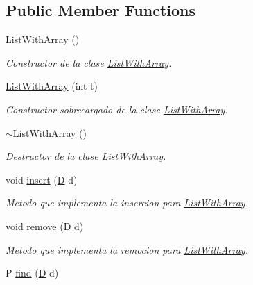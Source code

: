 \subsection*{Public Member Functions}
\begin{DoxyCompactItemize}
\item 
\hyperlink{class_list_with_array_a06f0e8035e9cc43aff4d32c46a00fcf0}{List\+With\+Array} ()
\begin{DoxyCompactList}\small\item\em Constructor de la clase \hyperlink{class_list_with_array}{List\+With\+Array}. \end{DoxyCompactList}\item 
\hyperlink{class_list_with_array_a3a6d11f203fb0f7e458672e85db26b03}{List\+With\+Array} (int t)
\begin{DoxyCompactList}\small\item\em Constructor sobrecargado de la clase \hyperlink{class_list_with_array}{List\+With\+Array}. \end{DoxyCompactList}\item 
\hyperlink{class_list_with_array_a1886482555430b0f3eb5ebe02cbb0c87}{$\sim$\+List\+With\+Array} ()
\begin{DoxyCompactList}\small\item\em Destructor de la clase \hyperlink{class_list_with_array}{List\+With\+Array}. \end{DoxyCompactList}\item 
void \hyperlink{class_list_with_array_afa0b6d215c2cc1d3fe6b9b48d6b6917d}{insert} (\hyperlink{gwp_2main_8cpp_af316c33cc298530f245e8b55330e86b5}{D} d)
\begin{DoxyCompactList}\small\item\em Metodo que implementa la insercion para \hyperlink{class_list_with_array}{List\+With\+Array}. \end{DoxyCompactList}\item 
void \hyperlink{class_list_with_array_aaa18e76fc128ca05151178d914901ec3}{remove} (\hyperlink{gwp_2main_8cpp_af316c33cc298530f245e8b55330e86b5}{D} d)
\begin{DoxyCompactList}\small\item\em Metodo que implementa la remocion para \hyperlink{class_list_with_array}{List\+With\+Array}. \end{DoxyCompactList}\item 
P \hyperlink{class_list_with_array_a9a054a6d407dc5cb39575739fe412fff}{find} (\hyperlink{gwp_2main_8cpp_af316c33cc298530f245e8b55330e86b5}{D} d)

\end{DoxyCompactItemize}
